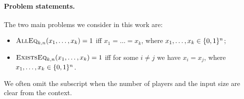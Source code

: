 \paragraph{Problem statements.}
The two main problems we consider in this work are:
\begin{itemize}
	\item $\text{\textsc{AllEq}}_{k,n}(x_1,\ldots,x_k) = 1$ iff $x_1 = \ldots = x_k$, where $x_1,\ldots,x_k \in \{ 0,1 \}^n$;
	\item $\text{\textsc{ExistsEq}}_{k,n}(x_1,\ldots,x_k) = 1$ iff for some $i \neq j$ we have $x_i = x_j$, where $x_1,\ldots,x_k \in \{ 0,1 \}^n$.
\end{itemize}

We often omit the subscript when the number of players and the input size are clear from the context.

